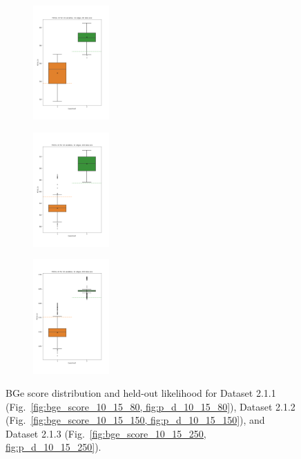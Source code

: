 \documentclass{lxaiproposal}
\begin{document}
\begin{figure}[h]
\begin{subfigure}
            \label{fig:bge_score_10_15_250}
        \end{subfigure}
        \hfill
        \begin{subfigure}
            \centering
            \includegraphics[width=0.32\textwidth]{figures/P_d_prime_10_15_80}
            \label{fig:p_d_10_15_80}
        \end{subfigure}
        \begin{subfigure}
            \centering
            \includegraphics[width=0.32\textwidth]{figures/P_d_prime_10_15_150}
            \label{fig:p_d_10_15_150}
        \end{subfigure}
        \begin{subfigure}
            \centering
            \includegraphics[width=0.32\textwidth]{figures/P_d_prime_10_15_250}
            \label{fig:p_d_10_15_250}
        \end{subfigure}
        \caption{BGe score distribution and held-out likelihood for Dataset 2.1.1 (Fig.~\ref{fig:bge_score_10_15_80,
            fig:p_d_10_15_80}), Dataset 2.1.2 (Fig.~\ref{fig:bge_score_10_15_150, fig:p_d_10_15_150}), and Dataset
        2.1.3 (Fig.~\ref{fig:bge_score_10_15_250, fig:p_d_10_15_250}).}
        \label{fig:illustration_10_15}
    \end{figure}
\end{document}
